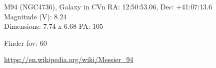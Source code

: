 \begin{block}{M94 (NGC4736), Galaxy in CVn}
    RA: 12:50:53.06, Dec: +41:07:13.6 \\ 
    Magnitude (V): 8.24 \\ 
    Dimensions: 7.74 x 6.68 PA: 105 

    Finder fov: 60 

    \url{https://en.wikipedia.org/wiki/Messier_94} 
\end{block}